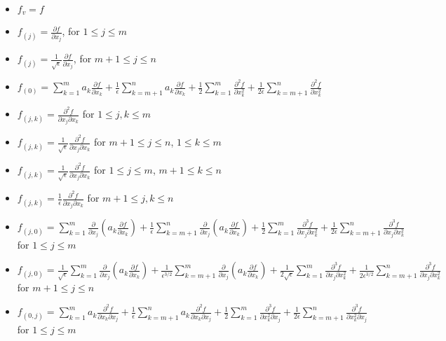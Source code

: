\documentclass[12pt]{article}
\begin{document}
\begin{itemize}
\item $f_v = f$
%
\item $f_{(j)} = \frac{\partial f}{\partial x_j}$, for $1 \le j \le m$
\item $f_{(j)} = \frac{1}{\sqrt{\epsilon}} \frac{\partial f}{\partial x_j}$, for $m+1 \le j \le n$
%
\item $f_{(0)} = \sum_{k=1}^m a_k \frac{\partial f}{\partial x_k} 
+ \frac{1}{\epsilon} \sum_{k=m+1}^n a_k \frac{\partial f}{\partial x_k} 
+ \frac{1}{2} \sum_{k=1}^m \frac{\partial^2 f}{\partial x_k^2}
+ \frac{1}{2 \epsilon} \sum_{k=m+1}^n \frac{\partial^2 f}{\partial x_k^2}$
%
\item $f_{(j, k)} =  \frac{\partial^2 f}{\partial x_j \partial x_k}  $ for $1 \le j,k \le m$
\item $f_{(j, k)} =  \frac{1}{\sqrt{\epsilon}} \frac{\partial^2 f}{\partial x_j \partial x_k} $ for $m+1 \le j \le n$, $1 \le k \le m$
\item $f_{(j, k)} =  \frac{1}{\sqrt{\epsilon}} \frac{\partial^2 f}{\partial x_j \partial x_k} $ for $1 \le j \le m$, $ m+1 \le k \le n$
\item $f_{(j, k)} =  \frac{1}{\epsilon} \frac{\partial^2 f}{\partial x_j \partial x_k} $ for $m+1 \le j,k \le n$
%
\item $f_{(j,0)} = \sum_{k=1}^m \frac{\partial }{\partial x_j} \left( a_k \frac{\partial f}{\partial x_k} \right) + \frac{1}{\epsilon} \sum_{k=m+1}^n \frac{\partial }{\partial x_j} \left( a_k \frac{\partial f}{\partial x_k} \right) + \frac{1}{2} \sum_{k=1}^m \frac{\partial^3 f}{\partial x_j \partial x_k^2} + \frac{1}{2 \epsilon} \sum_{k=m+1}^n \frac{\partial^3 f}{\partial x_j \partial x_k^2} $ for $1 \le j \le m$
\item $f_{(j,0)} = \frac{1}{\sqrt{\epsilon}} \sum_{k=1}^m \frac{\partial }{\partial x_j} \left( a_k \frac{\partial f}{\partial x_k} \right) + \frac{1}{\epsilon^{3/2}} \sum_{k=m+1}^m \frac{\partial }{\partial x_j} \left( a_k \frac{\partial f}{\partial x_k} \right) + \frac{1}{2 \sqrt{\epsilon}} \sum_{k=1}^m \frac{\partial^3 f}{\partial x_j \partial x_k^2} + \frac{1}{2 \epsilon^{3/2}} \sum_{k=m+1}^n \frac{\partial^3 f}{\partial x_j \partial x_k^2} $ for $m+1 \le j \le n$
%
\item $f_{(0, j)} = \sum_{k=1}^m a_k \frac{\partial^2 f}{\partial x_k \partial x_j} 
+ \frac{1}{\epsilon} \sum_{k=m+1}^n a_k \frac{\partial^2 f}{\partial x_k \partial x_j} 
 + \frac{1}{2} \sum_{k=1}^m \frac{\partial^3 f}{\partial x_k^2 \partial x_j} 
 +\frac{1}{2 \epsilon} \sum_{k=m+1}^n \frac{\partial^3 f}{\partial x_k^2 \partial x_j}$ for $1 \le j \le m$

\end{itemize}
\end{document}
